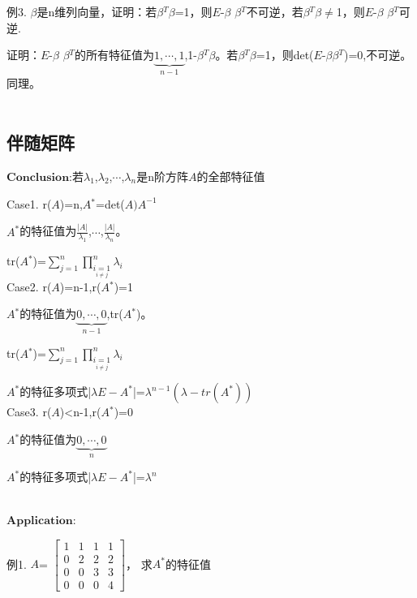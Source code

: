 \documentclass[lang=cn,10pt]{elegantbook}
\begin{document}
  例3. $\beta$是n维列向量，证明：若$\beta$$^{T}$$\beta$=1，则$\mathit{E}$-$\beta$
  $\beta$$^{T}$不可逆，若$\beta$$^{T}$$\beta$$\ne$1，则$\mathit{E}$-$\beta$
  $\beta$$^{T}$可逆.
  
  证明：$\mathit{E}$-$\beta$
  $\beta$$^{T}$的所有特征值为$\underset{n-1}{\underbrace{1,\cdots ,1} } $,1-$\beta$$^{T}$$\beta$。若$\beta$$^{T}$$\beta$=1，则det($\mathit{E}$-$\beta$$\beta$$^{T}$)=0,不可逆。同理。
  ~\\
  ~\\
  
\subsection{伴随矩阵}


 $\mathbf{Conclusion}$:若$\lambda$$_{1}$,$\lambda$$_{2}$,$\cdots$,$\lambda$$_{n}$是n阶方阵$\mathit{A}$的全部特征值
 
 Case1. r($\mathit{A}$)=n,$\mathit{A}$$^{*}$=det($\mathit{A}) 
 $$\mathit{A^{-1}}$
 
$\mathit{A}$$^{*}$的特征值为$\frac{|A|}{\lambda_{1}}$,$\cdots$,$\frac{|A|}{\lambda_{n}}$。

tr($\mathit{A}$$^{*}$)=$\sum_{j=1}^{n}\prod_{\underset{i\ne j}{i=1} }^{n}  \lambda_{i} $
~\\

Case2. r($\mathit{A}$)=n-1,r($\mathit{A}$$^{*}$)=1

$\mathit{A}$$^{*}$的特征值为$\underset{n-1}{\underbrace{0,\cdots ,0} } $,tr($\mathit{A}$$^{*}$)。

tr($\mathit{A}$$^{*}$)=$\sum_{j=1}^{n}\prod_{\underset{i\ne j}{i=1} }^{n}  \lambda_{i} $

$\mathit{A}^{*}$的特征多项式|$\lambda\mathit{E-{A}^{*}}$|=$\lambda^{n-1}(\lambda-tr(\mathit{A}^{*}))$
~\\


Case3. r($\mathit{A}$)<n-1,r($\mathit{A}$$^{*}$)=0

$\mathit{A}$$^{*}$的特征值为$\underset{n}{\underbrace{0,\cdots ,0} } $

$\mathit{A}^{*}$的特征多项式|$\lambda\mathit{E-{A}^{*}}$|=$\lambda^{n}$

~\\

$\mathbf{Application}$:

例1.  $\mathit{A}$=
$\begin{bmatrix}
	1 & 1 & 1 & 1\\
	0  & 2 & 2 & 2\\
	0 & 0 & 3 & 3\\
	0 & 0 & 0 &4
\end{bmatrix}$，
求$\mathit{A}^{*}$的特征值
\end{document}
